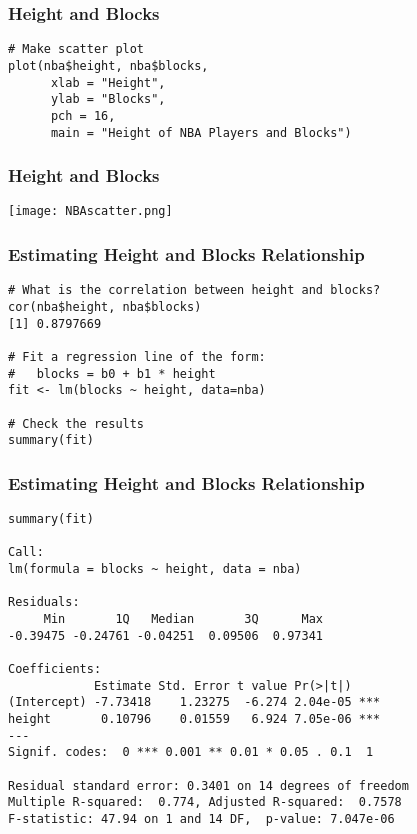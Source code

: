 \documentclass[handout,compress]{beamer}
\begin{document}
\begin{frame}[fragile]
 \frametitle{Height and Blocks}
 \begin{shaded}
\begin{verbatim}
# Make scatter plot
plot(nba$height, nba$blocks, 
	  xlab = "Height", 
	  ylab = "Blocks",
	  pch = 16, 
	  main = "Height of NBA Players and Blocks")
\end{verbatim}
\end{shaded}
\end{frame}

\begin{frame}[fragile]
 \frametitle{Height and Blocks}
\begin{center}
\texttt{[image: NBAscatter.png]}
\end{center}
\end{frame}

\begin{frame}[fragile]
 \frametitle{Estimating Height and Blocks Relationship}
 \begin{shaded}
 \begin{small}
\begin{verbatim}
# What is the correlation between height and blocks?
cor(nba$height, nba$blocks)
[1] 0.8797669

# Fit a regression line of the form:
#   blocks = b0 + b1 * height
fit <- lm(blocks ~ height, data=nba)

# Check the results
summary(fit)

\end{verbatim}
\end{small}
\end{shaded}
\end{frame}

\begin{frame}[fragile]
 \frametitle{Estimating Height and Blocks Relationship}
  \begin{shaded}
 \begin{small}
\begin{verbatim}
summary(fit)

Call:
lm(formula = blocks ~ height, data = nba)

Residuals:
     Min       1Q   Median       3Q      Max 
-0.39475 -0.24761 -0.04251  0.09506  0.97341 

Coefficients:
            Estimate Std. Error t value Pr(>|t|)    
(Intercept) -7.73418    1.23275  -6.274 2.04e-05 ***
height       0.10796    0.01559   6.924 7.05e-06 ***
---
Signif. codes:  0 *** 0.001 ** 0.01 * 0.05 . 0.1  1

Residual standard error: 0.3401 on 14 degrees of freedom
Multiple R-squared:  0.774,	Adjusted R-squared:  0.7578 
F-statistic: 47.94 on 1 and 14 DF,  p-value: 7.047e-06

\end{verbatim}
\end{small}
\end{shaded}
\end{frame}
\end{document}
